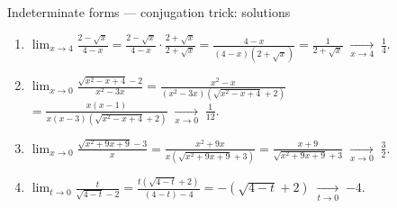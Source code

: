 \documentclass[9pt]{beamer}
\begin{document}
\begin{frame}{Indeterminate forms — conjugation trick: solutions}

\small
\begin{enumerate}[leftmargin=0.5cm, label=(\alph*), rightmargin=0.2cm]
\setlength\itemsep{0.3cm}
\item $\displaystyle \lim_{x\to 4}\frac{2-\sqrt{x}}{4-x}
=\frac{2-\sqrt{x}}{4-x}\cdot\frac{2+\sqrt{x}}{2+\sqrt{x}}
=\frac{4-x}{(4-x)(2+\sqrt{x})}
=\frac{1}{2+\sqrt{x}}\;\xrightarrow[x\to4]{}\;\boxed{\tfrac14}.$

\item $\displaystyle \lim_{x\to 0}\frac{\sqrt{x^2-x+4}-2}{x^2-3x}
=\frac{x^2-x}{(x^2-3x)(\sqrt{x^2-x+4}+2)}$ \\
\hspace{2.76cm} 
$=\frac{x(x-1)}{x(x-3)(\sqrt{x^2-x+4}+2)}
\;\xrightarrow[x\to0]{}\;\boxed{\tfrac{1}{12}}.$

\item $\displaystyle \lim_{x\to 0}\frac{\sqrt{x^2+9x+9}-3}{x}
=\frac{x^2+9x}{x(\sqrt{x^2+9x+9}+3)}
=\frac{x+9}{\sqrt{x^2+9x+9}+3}
\;\xrightarrow[x\to0]{}\;\boxed{\tfrac{3}{2}}.$

\item $\displaystyle \lim_{t\to 0}\frac{t}{\sqrt{4-t}-2}
=\frac{t(\sqrt{4-t}+2)}{(4-t)-4}
=-(\sqrt{4-t}+2)\;\xrightarrow[t\to0]{}\;\boxed{-4}.$

\end{enumerate}

\end{frame}





        
        
    
\end{document}
